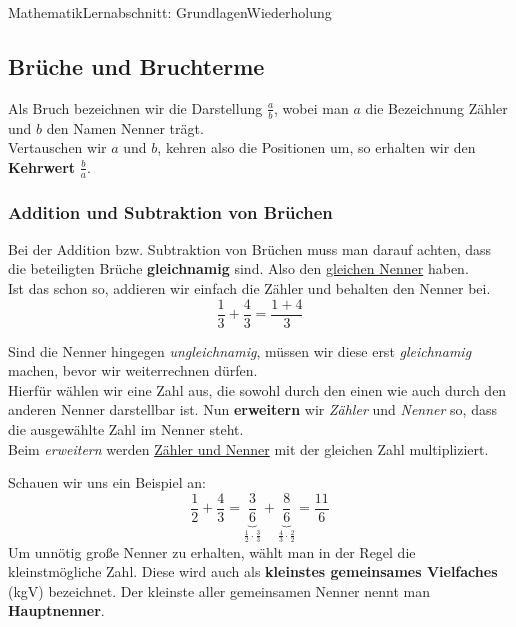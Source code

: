 \documentclass[11pt,twocolumn,oneside,openany,headings=optiontotoc,11pt,numbers=noenddot]{article}
\begin{document}
\begin{worksheet}{Mathematik}{Lernabschnitt: Grundlagen}{Wiederholung}
		\subsection{Brüche und Bruchterme}
		Als Bruch bezeichnen wir die Darstellung \(\frac{a}{b}\), wobei man \(a\) die Bezeichnung Zähler und \(b\) den Namen Nenner trägt.\\
		Vertauschen wir \(a\) und \(b\), kehren also die Positionen um, so erhalten wir den \textbf{Kehrwert} \(\frac{b}{a}\).\\
		\subsubsection*{Addition und Subtraktion von Brüchen}
		Bei der Addition bzw. Subtraktion von Brüchen muss man darauf achten, dass die beteiligten Brüche \textbf{gleichnamig} sind. Also den \underline{gleichen Nenner} haben.\\
		Ist das schon so, addieren wir einfach die Zähler und behalten den Nenner bei. \[\frac{1}{3} + \frac{4}{3} = \frac{1+4}{3}\]
		\par\noindent
		Sind die Nenner hingegen \textit{ungleichnamig}, müssen wir diese erst \textit{gleichnamig} machen, bevor wir weiterrechnen dürfen.\\
		Hierfür wählen wir eine Zahl aus, die sowohl durch den einen wie auch durch den anderen Nenner darstellbar ist. Nun \textbf{erweitern} wir \textit{Zähler} und \textit{Nenner} so, dass die ausgewählte Zahl im Nenner steht.\\
		Beim \textit{erweitern} werden \underline{Zähler und Nenner} mit der gleichen Zahl multipliziert.\\
		\par\noindent
		Schauen wir uns ein Beispiel an:
		\[\frac{1}{2} + \frac{4}{3} = \underbrace{\frac{3}{6}}_{\frac{1}{2}\cdot{}\frac{3}{3}} + \underbrace{\frac{8}{6}}_{\frac{4}{3}\cdot{}\frac{2}{2}} = \frac{11}{6}\]
		Um unnötig große Nenner zu erhalten, wählt man in der Regel die kleinstmögliche Zahl. Diese wird auch als \textbf{kleinstes gemeinsames Vielfaches} (kgV) bezeichnet. Der kleinste aller gemeinsamen Nenner nennt man \textbf{Hauptnenner}.

\end{worksheet}
\end{document}
